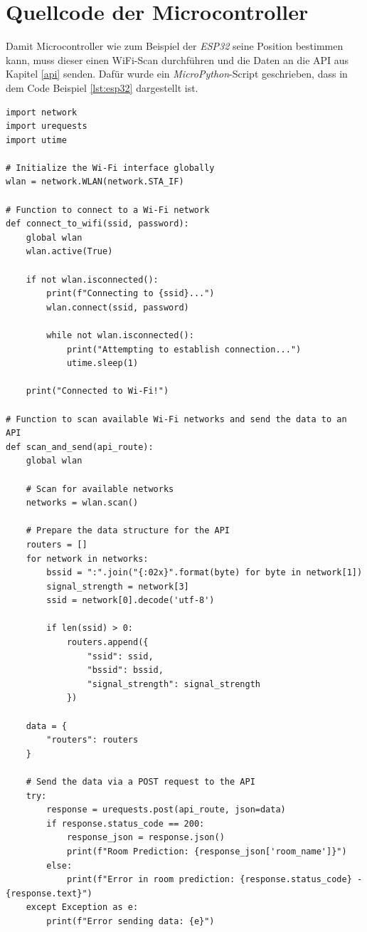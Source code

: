 \section{Quellcode der Microcontroller}

Damit Microcontroller wie zum Beispiel der \textit{ESP32} seine Position bestimmen kann, muss dieser einen WiFi-Scan durchführen und die Daten an die API aus Kapitel \ref{api} senden. Dafür wurde ein \textit{MicroPython}-Script geschrieben, dass in dem Code Beispiel \ref{lst:esp32} dargestellt ist.

\begin{lstlisting}[caption={\textit{MicroPython}-Quellcode für die Durchführung eines WiFi-Scans und die Raumbestimmung über die API}, label={lst:esp32}]
import network
import urequests
import utime

# Initialize the Wi-Fi interface globally
wlan = network.WLAN(network.STA_IF)

# Function to connect to a Wi-Fi network
def connect_to_wifi(ssid, password):
    global wlan
    wlan.active(True)
    
    if not wlan.isconnected():
        print(f"Connecting to {ssid}...")
        wlan.connect(ssid, password)
        
        while not wlan.isconnected():
            print("Attempting to establish connection...")
            utime.sleep(1)
    
    print("Connected to Wi-Fi!")

# Function to scan available Wi-Fi networks and send the data to an API
def scan_and_send(api_route):
    global wlan
    
    # Scan for available networks
    networks = wlan.scan()
    
    # Prepare the data structure for the API
    routers = []
    for network in networks:
        bssid = ":".join("{:02x}".format(byte) for byte in network[1])
        signal_strength = network[3]
        ssid = network[0].decode('utf-8')
        
        if len(ssid) > 0:
            routers.append({
                "ssid": ssid,
                "bssid": bssid,
                "signal_strength": signal_strength
            })
    
    data = {
        "routers": routers
    }
    
    # Send the data via a POST request to the API
    try:
        response = urequests.post(api_route, json=data)
        if response.status_code == 200:
            response_json = response.json()
            print(f"Room Prediction: {response_json['room_name']}")
        else:
            print(f"Error in room prediction: {response.status_code} - {response.text}")
    except Exception as e:
        print(f"Error sending data: {e}")


\end{lstlisting}
